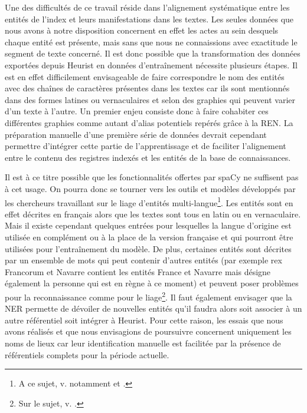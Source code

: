 \documentclass[a4paper,12pt,twoside]{book}
\begin{document}
	Une des difficultés de ce travail réside dans l'alignement systématique entre les entités de l'index et leurs manifestations dans les textes. Les seules données que nous avons à notre disposition concernent en effet les actes au sein desquels chaque entité est présente, mais sans que nous ne connaissions avec exactitude le segment de texte concerné. Il est donc possible que la transformation des données exportées depuis Heurist en données d'entraînement nécessite plusieurs étapes. Il est en effet difficilement envisageable de faire correspondre le nom des entités avec des chaînes de caractères présentes dans les textes car ils sont mentionnés dans des formes latines ou vernaculaires et selon des graphies qui peuvent varier d'un texte à l'autre. Un premier enjeu consiste donc à faire cohabiter ces différentes graphies comme autant d'alias potentiels repérés grâce à la REN. La préparation manuelle d'une première série de données devrait cependant permettre d'intégrer cette partie de l'apprentissage et de faciliter l'alignement entre le contenu des registres indexés et les entités de la base de connaissances.
	
	Il est à ce titre possible que les fonctionnalités offertes par spaCy ne suffisent pas à cet usage. On pourra donc se tourner vers les outils et modèles développés par les chercheurs travaillant sur le liage d'entités multi-langue\footnote{A ce sujet, v. notamment \cite{linhares_pontes_linking_2020} et \cite{rijhwani_zero-shot_2019}.}. Les entités sont en effet décrites en français alors que les textes sont tous en latin ou en vernaculaire. Mais il existe cependant quelques entrées pour lesquelles la langue d'origine est utilisée en complément ou à la place de la version française et qui pourront être utilisées pour l'entraînement du modèle. De plus, certaines entités sont décrites par un ensemble de mots qui peut contenir d'autres entités (par exemple \og rex Francorum et Navarre\fg{} contient les entités France et Navarre mais désigne également la personne qui est en règne à ce moment) et peuvent poser problèmes pour la reconnaissance comme pour le liage\footnote{Sur le sujet, v. \cite{mcdonough_named_2019}.}. Il faut également envisager que la NER permette de dévoiler de nouvelles entités qu'il faudra alors soit associer à un autre référentiel soit intégrer à Heurist. Pour cette raison, les essais que nous avons réalisés et que nous envisagions de poursuivre concernent uniquement les noms de lieux car leur identification manuelle est facilitée par la présence de référentiels complets pour la période actuelle.
	
\end{document}
